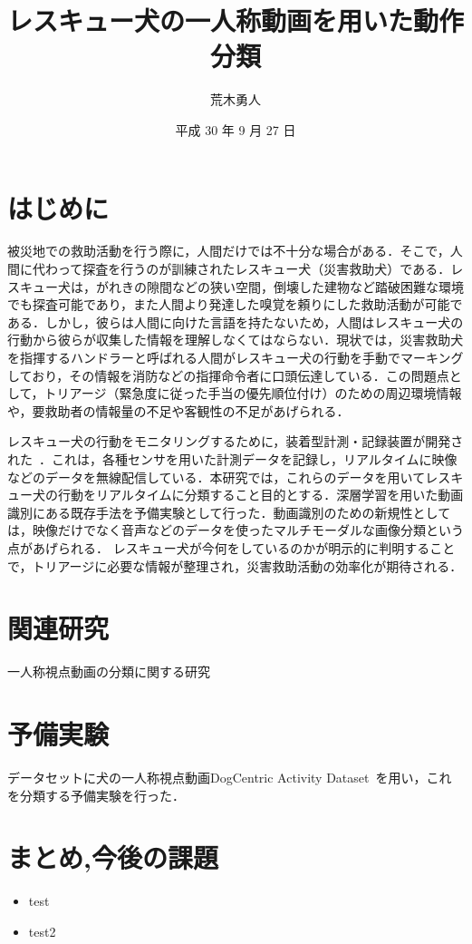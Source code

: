 \documentclass[twocolumn, a4paper]{UECIEresume}
\title{レスキュー犬の一人称動画を用いた動作分類}
\date{平成 30 年 9 月 27 日}
\affiliation{総合情報学科 メディア情報学コース}
\author{荒木勇人}
\begin{document}
\maketitle

\section{はじめに}
被災地での救助活動を行う際に，人間だけでは不十分な場合がある．そこで，人間に代わって探査を行うのが訓練されたレスキュー犬（災害救助犬）である．レスキュー犬は，がれきの隙間などの狭い空間，倒壊した建物など踏破困難な環境でも探査可能であり，また人間より発達した嗅覚を頼りにした救助活動が可能である．しかし，彼らは人間に向けた言語を持たないため，人間はレスキュー犬の行動から彼らが収集した情報を理解しなくてはならない．現状では，災害救助犬を指揮するハンドラーと呼ばれる人間がレスキュー犬の行動を手動でマーキングしており，その情報を消防などの指揮命令者に口頭伝達している．この問題点として，トリアージ（緊急度に従った手当の優先順位付け）のための周辺環境情報や，要救助者の情報量の不足や客観性の不足があげられる．

レスキュー犬の行動をモニタリングするために，装着型計測・記録装置が開発された~\cite{dog01}．これは，各種センサを用いた計測データを記録し，リアルタイムに映像などのデータを無線配信している．本研究では，これらのデータを用いてレスキュー犬の行動をリアルタイムに分類すること目的とする．深層学習を用いた動画識別にある既存手法を予備実験として行った．動画識別のための新規性としては，映像だけでなく音声などのデータを使ったマルチモーダルな画像分類という点があげられる．
レスキュー犬が今何をしているのかが明示的に判明することで，トリアージに必要な情報が整理され，災害救助活動の効率化が期待される．

\section{関連研究}
一人称視点動画の分類に関する研究


\section{予備実験}
データセットに犬の一人称視点動画DogCentric Activity Dataset~\cite{yumi2014first}を用い，これを分類する予備実験を行った．


\section{まとめ,今後の課題}
\begin{itemize}
  \item{test}
  \item{test2}
\end{itemize}

\begin{footnotesize}


\end{footnotesize}
\end{document}
